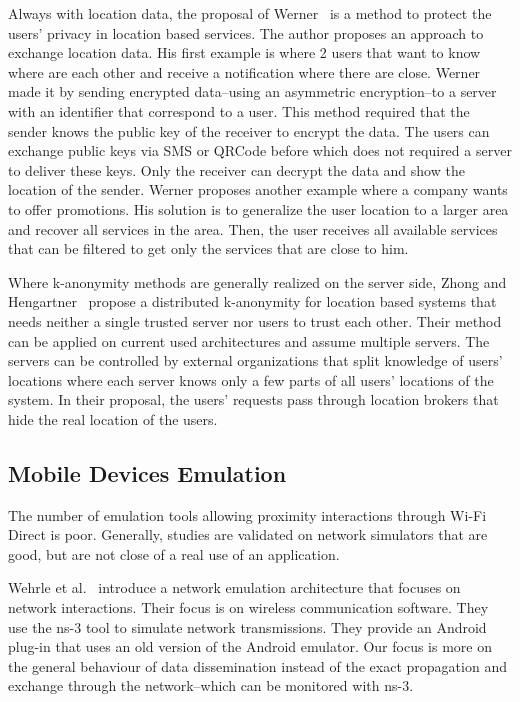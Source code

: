 
Always with location data, the proposal of Werner~\cite{DBLP:conf/mobisec/Werner10} is a method to protect the users' privacy in location based services.
The author proposes an approach to exchange location data.
His first example is where 2 users that want to know where are each other and receive a notification where there are close.
Werner made it by sending encrypted data--using an asymmetric encryption--to a server with an identifier that correspond to a user.
This method required that the sender knows the public key of the receiver to encrypt the data.  
The users can exchange public keys via SMS or QRCode before which does not required a server to deliver these keys.
Only the receiver can decrypt the data and show the location of the sender.
Werner proposes another example where a company wants to offer promotions.
His solution is to generalize the user location to a larger area and recover all services in the area.
Then, the user receives all available services that can be filtered to get only the services that are close to him.

Where k-anonymity methods are generally realized on the server side, Zhong and Hengartner~\cite{DBLP:conf/percom/ZhongH09} propose a distributed k-anonymity for location based systems that needs neither a single trusted server nor users to trust each other.
Their method can be applied on current used architectures and assume multiple servers.
The servers can be controlled by external organizations that split knowledge of users' locations where each server knows only a few parts of all users' locations of the system.
In their proposal, the users' requests pass through location brokers that hide the real location of the users.

\subsection{Mobile Devices Emulation}

The number of emulation tools allowing proximity interactions through Wi-Fi Direct is poor.
Generally, studies are validated on network simulators that are good, but are not close of a real use of an application.

Wehrle et al.~\cite{DBLP:conf/simutools/WeingartnerLW11} introduce a network emulation architecture that focuses on network interactions.
Their focus is on wireless communication software.
They use the ns-3 tool to simulate network transmissions.
They provide an Android plug-in that uses an old version of the Android emulator.
Our focus is more on the general behaviour of data dissemination instead of the exact propagation and exchange through the network--which can be monitored with ns-3.

